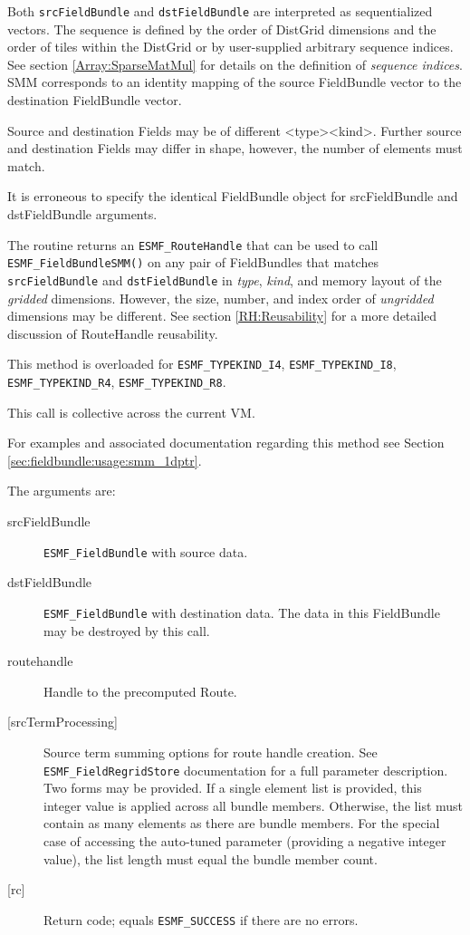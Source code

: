    Both {\tt srcFieldBundle} and {\tt dstFieldBundle} are interpreted as sequentialized
   vectors. The
   sequence is defined by the order of DistGrid dimensions and the order of
   tiles within the DistGrid or by user-supplied arbitrary sequence indices. See
   section \ref{Array:SparseMatMul} for details on the definition of {\em sequence indices}.
   SMM corresponds to an identity mapping of the source FieldBundle vector to
   the destination FieldBundle vector.
  
   Source and destination Fields may be of different <type><kind>. Further source
   and destination Fields may differ in shape, however, the number of elements
   must match.
  
   It is erroneous to specify the identical FieldBundle object for srcFieldBundle and dstFieldBundle
   arguments.
  
   The routine returns an {\tt ESMF\_RouteHandle} that can be used to call
   {\tt ESMF\_FieldBundleSMM()} on any pair of FieldBundles that matches
   {\tt srcFieldBundle} and {\tt dstFieldBundle} in {\em type}, {\em kind},
   and memory layout of the {\em gridded} dimensions. However, the size,
   number, and index order of {\em ungridded} dimensions may be different.
   See section \ref{RH:Reusability} for a more detailed discussion of
   RouteHandle reusability.
  
   \begin{sloppypar}
   This method is overloaded for
   {\tt ESMF\_TYPEKIND\_I4}, {\tt ESMF\_TYPEKIND\_I8},
   {\tt ESMF\_TYPEKIND\_R4}, {\tt ESMF\_TYPEKIND\_R8}.
   \end{sloppypar}
  
   This call is collective across the current VM.
  
   For examples and associated documentation regarding this method see Section
   \ref{sec:fieldbundle:usage:smm_1dptr}.
  
   The arguments are:
   \begin{description}
   \item [srcFieldBundle]
   {\tt ESMF\_FieldBundle} with source data.
   \item [dstFieldBundle]
   {\tt ESMF\_FieldBundle} with destination data. The data in this
   FieldBundle may be destroyed by this call.
   \item [routehandle]
   Handle to the precomputed Route.
   \item [{[srcTermProcessing]}]
   Source term summing options for route handle creation. See
   {\tt ESMF\_FieldRegridStore} documentation for a full parameter description.
   Two forms may be provided. If a single element list is provided, this
   integer value is applied across all bundle members. Otherwise, the list must
   contain as many elements as there are bundle members. For the special case
   of accessing the auto-tuned parameter (providing a negative integer value),
   the list length must equal the bundle member count.
   \item [{[rc]}]
   Return code; equals {\tt ESMF\_SUCCESS} if there are no errors.
   \end{description}
   
